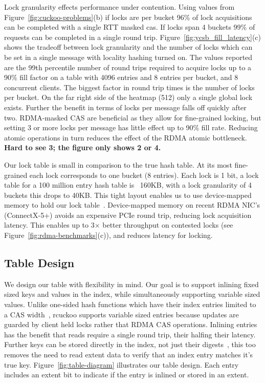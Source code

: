 Lock granularity effects performance under contention. Using
values from Figure~\ref{fig:cuckoo-problems}(b) if locks are
per bucket 96\% of lock acquisitions can be completed with a
single RTT masked cas. If locks span 4 buckets 99\% of
requests can be completed in a single round trip.
Figure~\ref{fig:ycsb_fill_latency}(c) shows the tradeoff between lock
granularity and the number of locks which can be set in a
single message with locality hashing turned on. The values
reported are the 99th percentile number of round trips
required to acquire locks up to a 90\% fill factor on a
table with 4096 entries and 8 entries per bucket, and 8
concurrent clients. The biggest factor in round trip times
is the number of locks per bucket. On the far right side of
the heatmap (512) only a single global lock exists. Further
the benefit in terms of locks per message falls off quickly
after two. RDMA-masked CAS are beneficial as they allow for
fine-grained locking, but setting 3 or more locks per
message has little effect up to 90\% fill rate. Reducing
atomic operations in turn reduces the effect of the RDMA
atomic bottleneck.  \textbf{Hard to see 3; the figure only shows 2 or 4.}

Our lock table is small in comparison to the true hash
table. At its most fine-grained each lock corresponds to
one bucket (8 entries). Each lock is 1 bit, a lock table for
a 100 million entry hash table is ~160KB, with a lock
granularity of 4 buckets this drops to 40KB. This tight
layout enables us to use device-mapped memory to hold our
lock table~\cite{design-guidelines,sherman}.
Device-mapped memory on recent RDMA NIC's (ConnectX-5+) avoids an
expensive PCIe round trip, reducing lock acquisition latency.
This enables up
to 3$\times$ better throughput on contested locks (see
Figure~\ref{fig:rdma-benchmarks}(c)), and reduces latency
for locking.

\subsection{Table Design}

We design our table with flexibility in mind. Our goal is to
support inlining fixed sized keys and values in the index,
while simultaneously supporting variable sized values.
Unlike one-sided hash functions which have their index
entries limited to a CAS width~\cite{race}, rcuckoo supports
variable sized entries because updates are guarded by client
held locks rather that RDMA CAS operations. Inlining entries
has the benefit that reads require a single round trip,
their halfing their latency. Further keys can be stored
directly in the index, not just their
digests~\cite{pilaf,race}, this too removes the need to read
extent data to verify that an index entry matches it's true
key. Figure~\ref{fig:table-diagram} illustrates our table
design.  Each entry includes an extent bit to indicate if
the entry is inlined or stored in an extent.



